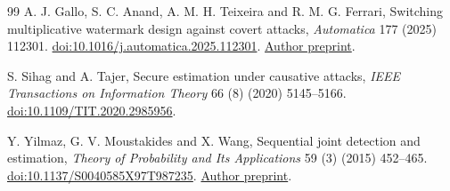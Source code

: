 \begin{thebibliography}{99}
A. J. Gallo, S. C. Anand, A. M. H. Teixeira and R. M. G. Ferrari,
Switching multiplicative watermark design against covert attacks,
\emph{Automatica} 177 (2025) 112301.
\href{https://doi.org/10.1016/j.automatica.2025.112301}{doi:10.1016/j.automatica.2025.112301}.
\href{https://arxiv.org/abs/2502.18948v1}{Author preprint}.

S. Sihag and A. Tajer,
Secure estimation under causative attacks,
\emph{IEEE Transactions on Information Theory} 66 (8) (2020) 5145--5166.
\href{https://doi.org/10.1109/TIT.2020.2985956}{doi:10.1109/TIT.2020.2985956}.

Y. Yilmaz, G. V. Moustakides and X. Wang,
Sequential joint detection and estimation,
\emph{Theory of Probability and Its Applications} 59 (3) (2015) 452--465.
\href{https://doi.org/10.1137/S0040585X97T987235}{doi:10.1137/S0040585X97T987235}.
\href{https://arxiv.org/abs/1302.6058}{Author preprint}.

\end{thebibliography}
